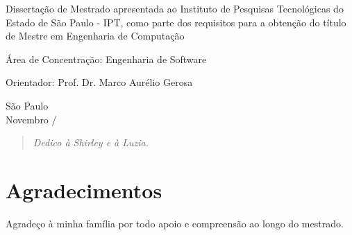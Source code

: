 \documentclass[12pt,twoside,a4paper]{book} %
\begin{document}
    \vskip 2cm

    \hspace{6cm}\begin{minipage}{0.48\linewidth}
	Dissertação de Mestrado apresentada
	ao Instituto de Pesquisas Tecnológicas do\\
	Estado de São Paulo - IPT, como 
	parte dos requisitos para a obtenção do 
	título de Mestre em Engenharia de 
	Computação
    \end{minipage}
    
    \vskip 2cm
    
    \hspace{6cm}\begin{minipage}{0.48\linewidth}
	Área de Concentração: Engenharia de Software
    \end{minipage}
    
    \vskip 2cm
    
    \hspace{6cm}\begin{minipage}{0.48\linewidth}
	Orientador: Prof. Dr. Marco Aurélio Gerosa
    \end{minipage}
    
    \vskip 6cm
    
    \begin{center}
        São Paulo\\
        
        Novembro / \the\year
    \end{center}

\pagebreak



\newpage
\thispagestyle{empty}

\begin{center}
        \vspace*{18 cm}
        \begin{quote}
            \begin{flushright}
            \textit{Dedico à Shirley e à Luzia.}
            \end{flushright}
        \end{quote}
    \end{center}


\pagebreak


\chapter*{Agradecimentos}
Agradeço à minha família por todo apoio e compreensão ao longo do mestrado.
\\
\end{document}
